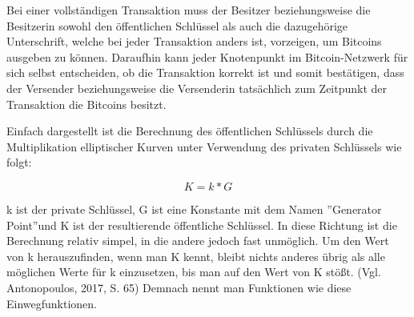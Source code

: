 Bei einer vollständigen Transaktion muss der Besitzer beziehungsweise die Besitzerin sowohl den öffentlichen Schlüssel als auch die
dazugehörige Unterschrift, welche bei jeder Transaktion anders ist, vorzeigen, um Bitcoins ausgeben zu können. Daraufhin kann 
jeder Knotenpunkt im Bitcoin-Netzwerk für sich selbst entscheiden, ob die Transaktion korrekt ist und somit bestätigen, dass 
der Versender beziehungsweise die Versenderin tatsächlich zum Zeitpunkt der Transaktion die Bitcoins besitzt.

Einfach dargestellt ist die Berechnung des öffentlichen Schlüssels durch die Multiplikation elliptischer Kurven unter Verwendung
des privaten Schlüssels wie folgt:

\[ K = k * G \]

k ist der private Schlüssel, G ist eine Konstante mit dem Namen ''Generator Point''und K ist der resultierende öffentliche 
Schlüssel. In diese Richtung ist die Berechnung relativ simpel, in die andere jedoch fast unmöglich. Um den Wert von k 
herauszufinden, wenn man K kennt, bleibt nichts anderes übrig als alle möglichen Werte für k einzusetzen, bis man auf den Wert 
von K stößt. (Vgl. Antonopoulos, 2017, S. 65) Demnach nennt man Funktionen wie diese Einwegfunktionen.



